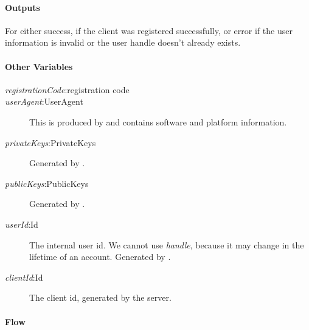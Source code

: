 \documentclass[a4paper,10pt]{article}
\newcommand{\handle}{\emph{handle}}
\newcommand{\registrationCode}{\emph{registrationCode}}
\newcommand{\userAgent}{\emph{userAgent}}
\newcommand{\privateKeys}{\emph{privateKeys}}
\newcommand{\publicKeys}{\emph{publicKeys}}
\newcommand{\userId}{\emph{userId}}
\newcommand{\clientId}{\emph{clientId}}
\begin{document}
\paragraph{Outputs}
For \Client{} either success, if the client was registered successfully, or error if the user information is invalid or the user handle doesn't already exists.

\paragraph{Other Variables}
\SpecialItem
\begin{description}
 \item[\registrationCode{}:registration code]
 \item[\userAgent{}:UserAgent] This is produced by \Client{} and contains software and platform information.
 \item[\privateKeys{}:PrivateKeys] Generated by \Client{}.
 \item[\publicKeys{}:PublicKeys] Generated by \Client{}.
 \item[\userId{}:Id] The internal user id. We cannot use \handle{}, because it may change in the lifetime of an account. Generated by \Server{}.
 \item[\clientId{}:Id] The client id, generated by the server.
\end{description}

\paragraph{Flow}
\end{document}
